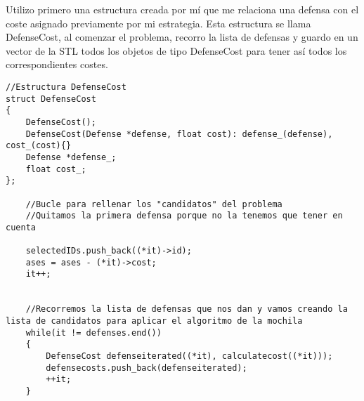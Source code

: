 Utilizo primero una estructura creada por mí que me relaciona una defensa con el coste asignado previamente por mi estrategia. Esta estructura se llama DefenseCost, al comenzar el problema, recorro la lista de defensas y guardo en un vector de la STL todos los objetos de tipo DefenseCost para tener así todos los correspondientes costes.

\begin{lstlisting}
//Estructura DefenseCost
struct DefenseCost
{
    DefenseCost();
    DefenseCost(Defense *defense, float cost): defense_(defense), cost_(cost){}
    Defense *defense_;
    float cost_;
};

    //Bucle para rellenar los "candidatos" del problema
    //Quitamos la primera defensa porque no la tenemos que tener en cuenta
 
    selectedIDs.push_back((*it)->id);
    ases = ases - (*it)->cost;
    it++;


    //Recorremos la lista de defensas que nos dan y vamos creando la lista de candidatos para aplicar el algoritmo de la mochila
    while(it != defenses.end())
    {
        DefenseCost defenseiterated((*it), calculatecost((*it)));
        defensecosts.push_back(defenseiterated);
        ++it;
    }



\end{lstlisting}